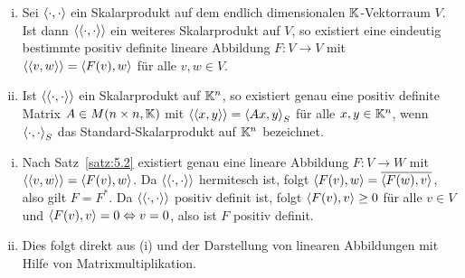 \begin{korollar}
	\label{kor:5.10}
	\begin{enumerate}[(i)]
		\item Sei $\left\langle\cdot,\cdot\right\rangle$ ein Skalarprodukt auf dem endlich dimensionalen $\mathbb{K}$-Vektorraum $V$.
		Ist dann $\left\langle\left\langle\cdot,\cdot\right\rangle\right\rangle$ ein weiteres Skalarprodukt auf $V$, so existiert eine eindeutig bestimmte positiv definite lineare Abbildung $F\colon V \rightarrow V$ mit $\left\langle\left\langle v,w\right\rangle\right\rangle = \left\langle F(v),w\right\rangle$ für alle $v,w \in V$.
		\item Ist $\left\langle\left\langle\cdot,\cdot\right\rangle\right\rangle$ ein Skalarprodukt auf $\mathbb{K}^n$, so existiert genau eine positiv definite Matrix $A \in M(n \times n,\mathbb{K})$ mit $\left\langle\left\langle x,y\right\rangle\right\rangle = \left\langle Ax,y\right\rangle_S$ für alle $x,y \in \mathbb{K}^n$, wenn $\left\langle\cdot,\cdot\right\rangle_S$ das Standard-Skalarprodukt auf $\mathbb{K}^n$ bezeichnet.
	\end{enumerate}
\end{korollar}

\begin{beweis}
	\begin{enumerate}[(i)]
		\item Nach Satz~\ref{satz:5.2} existiert genau eine lineare Abbildung $F \colon V \rightarrow W$ mit $\left\langle\left\langle v,w\right\rangle\right\rangle = \left\langle F(v),w\right\rangle$.
		Da $\left\langle\left\langle\cdot,\cdot\right\rangle\right\rangle$ hermitesch ist, folgt $\left\langle F(v),w\right\rangle = \overline{\left\langle F(w),v\right\rangle}$, also gilt $F = F^*$.
		Da $\left\langle\left\langle\cdot,\cdot\right\rangle\right\rangle$ positiv definit ist, folgt $\left\langle F(v),v\right\rangle \geq 0$ für alle $v \in V$ und $\left\langle F(v),v\right\rangle = 0 \Leftrightarrow v = 0$, also ist $F$ positiv definit.
		\item Dies folgt direkt aus (i) und der Darstellung von linearen Abbildungen mit Hilfe von Matrixmultiplikation. 
	\end{enumerate}
\end{beweis}

